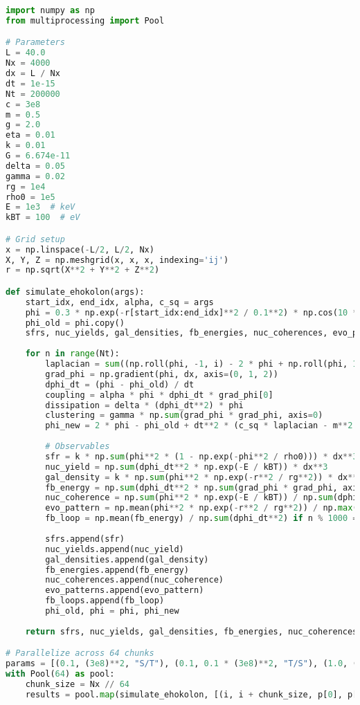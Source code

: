 \documentclass[11pt]{article}
\begin{document}
\begin{lstlisting}[language=Python, caption={Fluxonic Star Formation Simulation}, label=lst:simulation]
import numpy as np
from multiprocessing import Pool

# Parameters
L = 40.0
Nx = 4000
dx = L / Nx
dt = 1e-15
Nt = 200000
c = 3e8
m = 0.5
g = 2.0
eta = 0.01
k = 0.01
G = 6.674e-11
delta = 0.05
gamma = 0.02
rg = 1e4
rho0 = 1e5
E = 1e3  # keV
kBT = 100  # eV

# Grid setup
x = np.linspace(-L/2, L/2, Nx)
X, Y, Z = np.meshgrid(x, x, x, indexing='ij')
r = np.sqrt(X**2 + Y**2 + Z**2)

def simulate_ehokolon(args):
    start_idx, end_idx, alpha, c_sq = args
    phi = 0.3 * np.exp(-r[start_idx:end_idx]**2 / 0.1**2) * np.cos(10 * X[start_idx:end_idx]) + 0.1 * np.random.rand(Nx//64, Nx, Nx)
    phi_old = phi.copy()
    sfrs, nuc_yields, gal_densities, fb_energies, nuc_coherences, evo_patterns, fb_loops = [], [], [], [], [], [], []
    
    for n in range(Nt):
        laplacian = sum((np.roll(phi, -1, i) - 2 * phi + np.roll(phi, 1, i)) / dx**2 for i in range(3))
        grad_phi = np.gradient(phi, dx, axis=(0, 1, 2))
        dphi_dt = (phi - phi_old) / dt
        coupling = alpha * phi * dphi_dt * grad_phi[0]
        dissipation = delta * (dphi_dt**2) * phi
        clustering = gamma * np.sum(grad_phi * grad_phi, axis=0)
        phi_new = 2 * phi - phi_old + dt**2 * (c_sq * laplacian - m**2 * phi - g * phi**3 - eta * phi**5 + 8 * np.pi * G * k * phi**2 + coupling - dissipation + clustering)
        
        # Observables
        sfr = k * np.sum(phi**2 * (1 - np.exp(-phi**2 / rho0))) * dx**3
        nuc_yield = np.sum(dphi_dt**2 * np.exp(-E / kBT)) * dx**3
        gal_density = k * np.sum(phi**2 * np.exp(-r**2 / rg**2)) * dx**3
        fb_energy = np.sum(dphi_dt**2 * np.sum(grad_phi * grad_phi, axis=0)) * dx**3
        nuc_coherence = np.sum(phi**2 * np.exp(-E / kBT)) / np.sum(dphi_dt**2)
        evo_pattern = np.mean(phi**2 * np.exp(-r**2 / rg**2)) / np.max(phi**2)
        fb_loop = np.mean(fb_energy) / np.sum(dphi_dt**2) if n % 1000 == 0 else 0
        
        sfrs.append(sfr)
        nuc_yields.append(nuc_yield)
        gal_densities.append(gal_density)
        fb_energies.append(fb_energy)
        nuc_coherences.append(nuc_coherence)
        evo_patterns.append(evo_pattern)
        fb_loops.append(fb_loop)
        phi_old, phi = phi, phi_new
    
    return sfrs, nuc_yields, gal_densities, fb_energies, nuc_coherences, evo_patterns, fb_loops

# Parallelize across 64 chunks
params = [(0.1, (3e8)**2, "S/T"), (0.1, 0.1 * (3e8)**2, "T/S"), (1.0, (3e8)**2, "S=T")]
with Pool(64) as pool:
    chunk_size = Nx // 64
    results = pool.map(simulate_ehokolon, [(i, i + chunk_size, p[0], p[1]) for i in range(0, Nx, chunk_size) for p in params])
\end{lstlisting}
\end{document}
